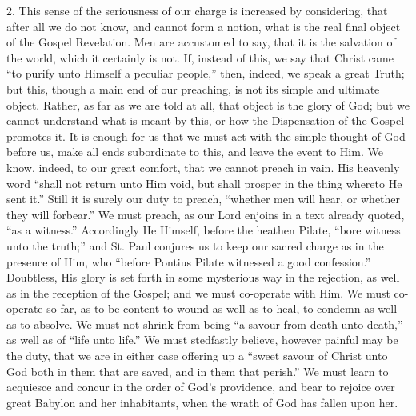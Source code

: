 2. This sense of the seriousness of our charge is increased by
considering, that after all we do not know, and cannot form a notion,
what is the real final object of the Gospel Revelation. Men are
accustomed to say, that it is the salvation of the world, which it
certainly is not. If, instead of this, we say that Christ came ``to
purify unto Himself a peculiar people,'' then, indeed, we speak a
great Truth; but this, though a main end of our preaching, is not its
simple and ultimate object. Rather, as far as we are told at all, that
object is the glory of God; but we cannot understand what is meant by
this, or how the Dispensation of the Gospel promotes it. It is enough
for us that we must act with the simple thought of God before us, make
all ends subordinate to this, and leave the event to Him. We know,
indeed, to our great comfort, that we cannot preach in vain. His
heavenly word ``shall not return unto Him void, but shall prosper in
the thing whereto He sent it.'' Still it is surely our duty to
preach, ``whether men will hear, or whether they will forbear.''
We must preach, as our Lord enjoins in a text already quoted, ``as a
witness.'' Accordingly He Himself, before the heathen Pilate,
``bore witness unto the truth;'' and St. Paul conjures us to
keep our sacred charge as in the presence of Him, who ``before
Pontius Pilate witnessed a good confession.'' Doubtless, His glory
is set forth in some mysterious way in the rejection, as well as in the
reception of the Gospel; and we must co-operate with Him. We must
co-operate so far, as to be content to wound as well as to heal, to
condemn as well as to absolve. We must not shrink from being ``a
savour from death unto death,'' as well as of ``life unto
life.'' We must stedfastly believe, however painful may be the duty,
that we are in either case offering up a ``sweet savour of Christ
unto God both in them that are saved, and in them that perish.'' We
must learn to acquiesce and concur in the order of God's providence, and
bear to rejoice over great Babylon and her inhabitants, when the wrath
of God has fallen upon her.

